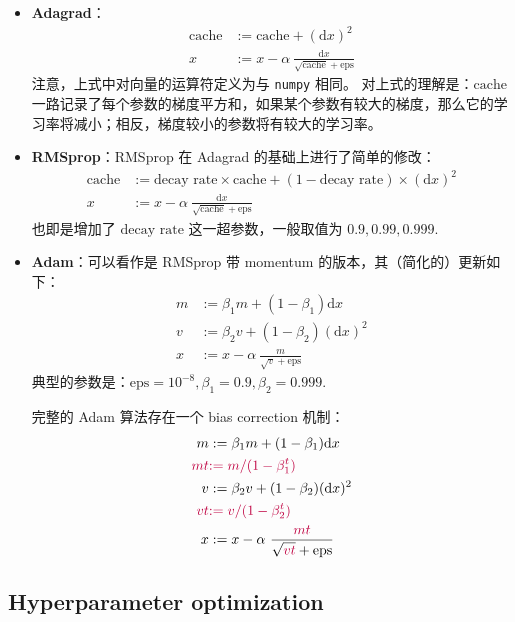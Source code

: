 \begin{itemize}
    \item \textbf{Adagrad}：
    \begin{align*}
    \text{cache}&:=\text{cache}+(\mathrm dx)^2\\
    x&:=x-\alpha\ \frac{\mathrm dx}{\sqrt{\text{cache}}+\text{eps}}
    \end{align*}
    注意，上式中对向量的运算符定义为与 \texttt{numpy} 相同。
    对上式的理解是：$\text{cache}$ 一路记录了每个参数的梯度平方和，如果某个参数有较大的梯度，那么它的学习率将减小；相反，梯度较小的参数将有较大的学习率。

    \item \textbf{RMSprop}：RMSprop 在 Adagrad 的基础上进行了简单的修改：
    \begin{align*}
    \text{cache}&:=\text{decay rate}\times \text{cache}+(1-\text{decay rate})\times (\mathrm dx)^2\\
    x&:=x-\alpha\ \frac{\mathrm dx}{\sqrt{\text{cache}}+\text{eps}}
    \end{align*}
    也即是增加了 $\text{decay rate}$ 这一超参数，一般取值为 $0.9,0.99,0.999$.

    \item \textbf{Adam}：可以看作是 RMSprop 带 momentum 的版本，其（简化的）更新如下：
    \begin{align*}
    m&:=\beta_1m+(1-\beta_1)\mathrm dx\\
    v&:=\beta_2v+(1-\beta_2)(\mathrm dx)^2\\
    x&:=x-\alpha\ \frac{m}{\sqrt{v}+\text{eps}}
    \end{align*}
    典型的参数是：$\text{eps}=10^{-8},\beta_1=0.9,\beta_2=0.999$.

    完整的 Adam 算法存在一个 bias correction 机制：
    \begin{align*}
    m&:=\beta_1m+(1-\beta_1)\mathrm dx\\
    \color{purple}{mt}&\color{purple}{:={m}/({1-\beta_1^t})}\\
    v&:=\beta_2v+(1-\beta_2)(\mathrm dx)^2\\
    \color{purple}{vt}&\color{purple}{:=v/(1-\beta_2^t)}\\
    x&:=x-\alpha\ \frac{\color{purple}{mt}}{\sqrt{\color{purple}{vt}}+\text{eps}}
    \end{align*}

\end{itemize}

\subsection{Hyperparameter optimization}

